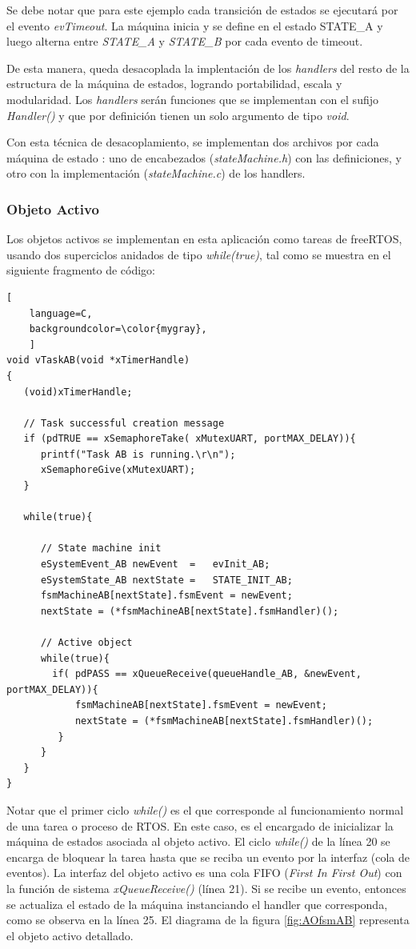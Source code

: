 Se debe notar que para este ejemplo cada transición de estados se ejecutará por el evento \textit{evTimeout}. La máquina inicia y se define en el estado STATE\_A y luego alterna entre \textit{STATE\_A} y \textit{STATE\_B} por cada evento de timeout.

De esta manera, queda desacoplada la implentación de los \textit{handlers} del resto de la estructura de la máquina de estados, logrando portabilidad, escala y modularidad. Los \textit{handlers} serán funciones que se implementan con el sufijo \textit{Handler()} y que por definición tienen un solo argumento de tipo \textit{void}.

Con esta técnica de desacoplamiento, se implementan dos archivos por cada máquina de estado : uno de encabezados (\textit{stateMachine.h}) con las definiciones, y otro con la implementación (\textit{stateMachine.c}) de los handlers.




\subsubsection{Objeto Activo}
	
Los objetos activos se implementan en esta aplicación como tareas de freeRTOS, usando dos superciclos anidados de tipo \textit{while(true)}, tal como se muestra en el siguiente fragmento de código: 

\begin{lstlisting}[
	language=C, 
	backgroundcolor=\color{mygray},
	]
void vTaskAB(void *xTimerHandle)
{
   (void)xTimerHandle;

   // Task successful creation message
   if (pdTRUE == xSemaphoreTake( xMutexUART, portMAX_DELAY)){
      printf("Task AB is running.\r\n");
      xSemaphoreGive(xMutexUART);
   }

   while(true){
      
      // State machine init
      eSystemEvent_AB newEvent	=	evInit_AB;
      eSystemState_AB nextState	=	STATE_INIT_AB;
      fsmMachineAB[nextState].fsmEvent = newEvent; 
      nextState = (*fsmMachineAB[nextState].fsmHandler)();

      // Active object
      while(true){
        if( pdPASS == xQueueReceive(queueHandle_AB, &newEvent, portMAX_DELAY)){
            fsmMachineAB[nextState].fsmEvent = newEvent; 
            nextState = (*fsmMachineAB[nextState].fsmHandler)();
         }
      }
   }
}
\end{lstlisting}

Notar que el primer ciclo \textit{while()} es el que corresponde al funcionamiento normal de una tarea o proceso de RTOS. En este caso, es el encargado de inicializar la máquina de estados asociada al objeto activo. El ciclo \textit{while()} de la línea 20 se encarga de bloquear la tarea hasta que se reciba un evento por la interfaz (cola de eventos). La interfaz del objeto activo es una cola FIFO (\textit{First In First Out}) con la función de sistema \textit{xQueueReceive() }(línea 21). Si se recibe un evento, entonces se actualiza el estado de la máquina instanciando el handler que corresponda, como se observa en la línea 25. El diagrama de la figura \ref{fig:AOfsmAB} representa el objeto activo detallado. 

